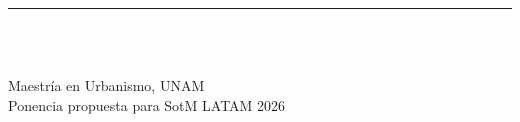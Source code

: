 
\begin{titlepage}
\thispagestyle{empty}
\setcounter{page}{0}
\centering

\vspace*{4cm}

{\huge\bfseries \TituloArticulo}

\vspace{1.0cm}
{\color{ColorPrincipal}\rule{0.45\textwidth}{0.8pt}}
\vspace{0.8cm}

{\large\itshape\color{ColorTexto} \SubtituloArticulo}

\vfill

{\normalsize\textbf{\Autor}}\\[0.4cm]
{\small \Materia}\\[0.15cm]
{\small \FechaEntrega}

\vspace{1.8cm}

{\footnotesize\color{ColorPrincipal}
  Maestría en Urbanismo, UNAM\\
  Ponencia propuesta para SotM LATAM 2026%
}

\vspace{1cm}

\end{titlepage}
